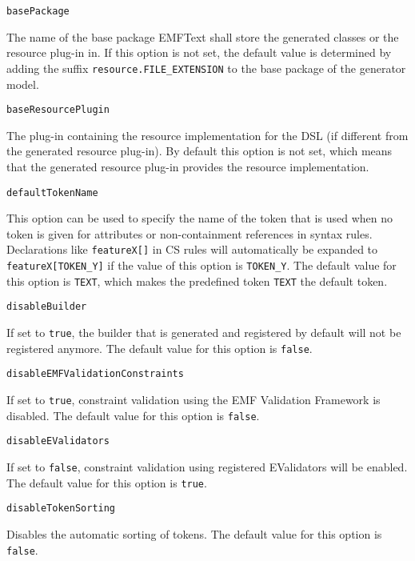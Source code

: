 \noindent\texttt{basePackage}
\begin{myindentpar}{1cm}
The name of the base package EMFText shall store the generated classes or the resource plug-in in. If this option is not set, the default value is determined by adding the suffix \texttt{resource.FILE\_EXTENSION} to the base package of the generator model.
\end{myindentpar}

\noindent\texttt{baseResourcePlugin}
\begin{myindentpar}{1cm}
The plug-in containing the resource implementation for the DSL (if different from the generated resource plug-in). By default this option is not set, which means that the generated resource plug-in provides the resource implementation.
\end{myindentpar}

\noindent\texttt{defaultTokenName}
\begin{myindentpar}{1cm}
This option can be used to specify the name of the token that is used when no token is given for attributes or non-containment references in syntax rules. Declarations like \texttt{featureX[]} in CS rules will automatically be expanded to \texttt{featureX[TOKEN\_Y]} if the value of this option is \texttt{TOKEN\_Y}. The default value for this option is \texttt{TEXT}, which makes the predefined token \texttt{TEXT} the default token.
\end{myindentpar}

\noindent\texttt{disableBuilder}
\begin{myindentpar}{1cm}
If set to \texttt{true}, the builder that is generated and registered by default will not be registered anymore. The default value for this option is \texttt{false}.
\end{myindentpar}

\noindent\texttt{disableEMFValidationConstraints}
\begin{myindentpar}{1cm}
If set to \texttt{true}, constraint validation using the EMF Validation Framework is disabled. The default value for this option is \texttt{false}.
\end{myindentpar}

\noindent\texttt{disableEValidators}
\begin{myindentpar}{1cm}
If set to \texttt{false}, constraint validation using registered EValidators will be enabled. The default value for this option is \texttt{true}.
\end{myindentpar}

\noindent\texttt{disableTokenSorting}
\begin{myindentpar}{1cm}
Disables the automatic sorting of tokens. The default value for this option is \texttt{false}.
\end{myindentpar}

